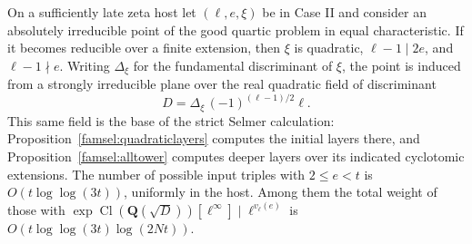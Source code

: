 \begin{corollary}
\label{adds:quartic}
On a sufficiently late zeta host let \((\ell,e,\xi)\) be in Case II
and consider an absolutely irreducible point of the good quartic
problem in equal characteristic. If it becomes reducible over a
finite extension, then \(\xi\) is quadratic,
\(\ell-1\mid 2e\), and \(\ell-1\nmid e\). Writing \(\Delta_\xi\)
for the fundamental discriminant of \(\xi\), the point is induced
from a strongly irreducible plane over the real quadratic field
of discriminant
\[
            D=\Delta_\xi\,(-1)^{(\ell-1)/2}\ell .
\]
This same field is the base of the strict Selmer calculation:
Proposition~\ref{famsel:quadraticlayers} computes the initial layers
there, and Proposition~\ref{famsel:alltower} computes deeper layers
over its indicated cyclotomic extensions.
The number of possible input triples with \(2\le e<t\) is
\(O(t\log\log(3t))\), uniformly in the host. Among them the total
weight of those with
\(\exp\operatorname{Cl}(\mathbf Q(\sqrt D))[\ell^\infty]\mid
\ell^{v_\ell(e)}\) is \(O(t\log\log(3t)\log(2Nt))\).
\end{corollary}
